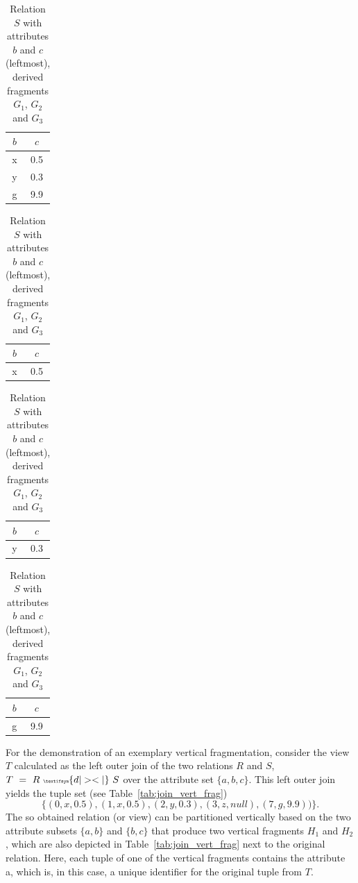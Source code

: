 \begin{exmp}
\begin{table}[h]
    \hspace*{\fill}
    \begin{center}
    \begin{tabular}{|c|c|}
        \hline
        $b$ & $c$\\
        \hline
        x & 0.5 \\
        y & 0.3 \\
        g & 9.9 \\
        \hline
    \end{tabular}
    \hspace{20pt}
    \begin{tabular}{|c|c|}
        \hline
        $b$ & $c$\\
        \hline
        x & 0.5
    \end{tabular}
    \hspace{5pt}
    \begin{tabular}{|c|c|}
        \hline
        $b$ & $c$\\
        \hline
        y & 0.3 \\
        \hline
    \end{tabular}
    \hspace{5pt}
    \begin{tabular}{|c|c|}
        \hline
        $b$ & $c$ \\
        \hline
        g & 9.9 \\
        \hline
    \end{tabular}
    \caption{Relation $S$ with attributes $b$ and $c$ (leftmost), derived fragments $G_1$, $G_2$ and $G_3$}
    \label{tab:s}
    \end{center}
\end{table}

For the demonstration of an exemplary vertical fragmentation, consider the view $T$ calculated as the left outer join of the two relations $R$ and $S$, 
$T~=~R~{\tiny \textifsym{d|><|}}~S$ over the attribute set $\{a,b,c\}$. 
This left outer join yields the tuple set (see Table~\ref{tab:join_vert_frag})
\[
\{(0,x,0.5), (1,x,0.5), (2,y,0.3), (3,z,null), (7,g,9.9))\}.
\]
The so obtained relation (or view) can be partitioned vertically based on the two attribute subsets $\{a,b\}$ and $\{b,c\}$ that produce two vertical
fragments $H_1$ and $H_2$, which are also depicted in Table~\ref{tab:join_vert_frag} next to the original relation. Here, each tuple of one of the 
vertical fragments contains the attribute a, which is, in this case, a unique identifier for the original tuple from $T$.


\end{exmp}

